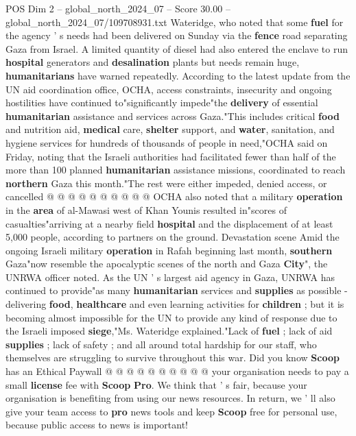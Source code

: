 \begin{textsample}{POS Dim 2 – global\_north\_2024\_07 – Score 30.00 – global\_north\_2024\_07/109708931.txt}
Wateridge, who noted that some \textbf{fuel} for the agency ' s needs had been delivered on Sunday via the \textbf{fence} road separating Gaza from Israel.
A limited quantity of diesel had also entered the enclave to run \textbf{hospital} generators and \textbf{desalination} plants but needs remain huge, \textbf{humanitarians} have warned repeatedly.
According to the latest update from the UN aid coordination office, OCHA, access constraints, insecurity and ongoing hostilities have continued to"significantly impede"the \textbf{delivery} of essential \textbf{humanitarian} assistance and services across Gaza."This includes critical \textbf{food} and nutrition aid, \textbf{medical} care, \textbf{shelter} support, and \textbf{water}, sanitation, and hygiene services for hundreds of thousands of people in need,"OCHA said on Friday, noting that the Israeli authorities had facilitated fewer than half of the more than 100 planned \textbf{humanitarian} assistance missions, coordinated to reach \textbf{northern} Gaza this month."The rest were either impeded, denied access, or cancelled @ @ @ @ @ @ @ @ @ @ OCHA also noted that a military \textbf{operation} in the \textbf{area} of al-Mawasi west of Khan Younis resulted in"scores of casualties"arriving at a nearby field \textbf{hospital} and the displacement of at least 5,000 people, according to partners on the ground.
Devastation scene Amid the ongoing Israeli military \textbf{operation} in Rafah beginning last month, \textbf{southern} Gaza"now resemble the apocalyptic scenes of the north and Gaza \textbf{City}", the UNRWA officer noted.
As the UN ' s largest aid agency in Gaza, UNRWA has continued to provide"as many \textbf{humanitarian} services and \textbf{supplies} as possible - delivering \textbf{food}, \textbf{healthcare} and even learning activities for \textbf{children} ; but it is becoming almost impossible for the UN to provide any kind of response due to the Israeli imposed \textbf{siege},"Ms.
Wateridge explained."Lack of \textbf{fuel} ; lack of aid \textbf{supplies} ; lack of safety ; and all around total hardship for our staff, who themselves are struggling to survive throughout this war.
Did you know \textbf{Scoop} has an Ethical Paywall @ @ @ @ @ @ @ @ @ @ your organisation needs to pay a small \textbf{license} fee with \textbf{Scoop} \textbf{Pro}.
We think that ' s fair, because your organisation is benefiting from using our news resources.
In return, we ' ll also give your team access to \textbf{pro} news tools and keep \textbf{Scoop} free for personal use, because public access to news is important!

\end{textsample}
